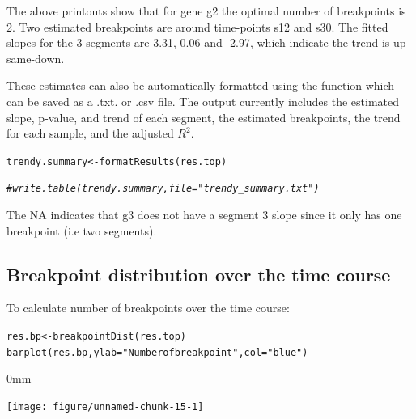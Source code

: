 \documentclass{article}\usepackage[]{graphicx}\usepackage[usenames,dvipsnames]{color}
\newcommand{\hlstr}[1]{\textcolor[rgb]{0.251,0.627,0.251}{#1}}%
\newcommand{\hlcom}[1]{\textcolor[rgb]{0.502,0.502,0.502}{\textit{#1}}}%
\newcommand{\hlstd}[1]{\textcolor[rgb]{0.251,0.251,0.251}{#1}}%
\newcommand{\hlkwb}[1]{\textcolor[rgb]{0,0,0}{#1}}%
\newcommand{\hlkwc}[1]{\textcolor[rgb]{0.251,0.251,0.251}{#1}}%
\newcommand{\hlkwd}[1]{\textcolor[rgb]{0.878,0.439,0.125}{#1}}%
\newenvironment{knitrout}{}{} %
\begin{document}
The above printouts show that for gene g2 the optimal number of breakpoints
is 2. Two estimated breakpoints are around time-points s12 and s30.
The fitted slopes for the 3 segments are 3.31, 0.06 and -2.97, which indicate the trend is up-same-down.


These estimates can also be automatically formatted using the function 
which can be saved as a .txt. or .csv file. The output currently includes the estimated slope, p-value, and trend of
each segment, the estimated breakpoints, the trend for each sample, and the adjusted $R^2$.

\begin{knitrout}
\color{fgcolor}\begin{kframe}
\begin{alltt}
\hlstd{trendy.summary} \hlkwb{<-} \hlkwd{formatResults}\hlstd{(res.top)}

\hlcom{# write.table(trendy.summary, file="trendy_summary.txt")}
\end{alltt}
\end{kframe}
\end{knitrout}
The NA indicates that g3 does not have a segment 3 slope since it only has one breakpoint (i.e two segments).


\subsection{Breakpoint distribution over the time course}

To calculate number of breakpoints over the time course:

\begin{knitrout}
\color{fgcolor}\begin{kframe}
\begin{alltt}
\hlstd{res.bp} \hlkwb{<-} \hlkwd{breakpointDist}\hlstd{(res.top)}
\hlkwd{barplot}\hlstd{(res.bp,} \hlkwc{ylab}\hlstd{=}\hlstr{"Number of breakpoint"}\hlstd{,} \hlkwc{col}\hlstd{=}\hlstr{"blue"}\hlstd{)}
\end{alltt}
\end{kframe}\begin{adjustwidth}{\fltoffset}{0mm}

{\centering \texttt{[image: figure/unnamed-chunk-15-1]} 

}

\end{adjustwidth}
\end{knitrout}
\end{document}
